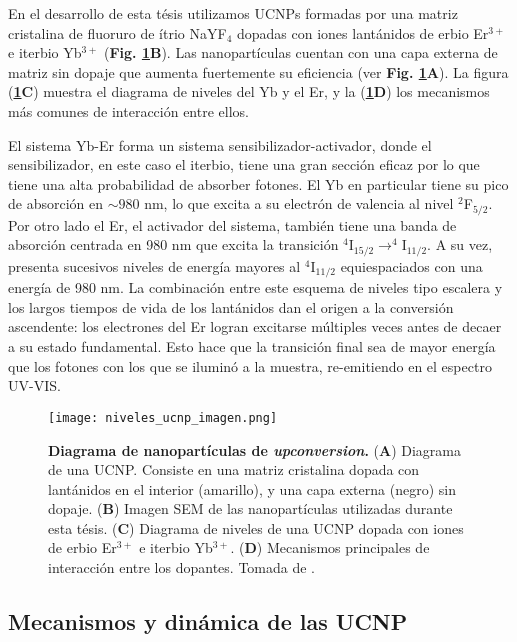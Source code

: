 En el desarrollo de esta tésis utilizamos UCNPs formadas por una matriz cristalina de fluoruro de ítrio NaYF$_4$ dopadas con iones lantánidos de erbio Er$^{3+}$ e iterbio Yb$^{3+}$ (\textbf{Fig. \ref{fig:ucnp_niveles}B}).
Las nanopartículas cuentan con una capa externa de matriz sin dopaje que aumenta fuertemente su eficiencia (ver \textbf{Fig. \ref{fig:ucnp_niveles}A})\cite{mai_highly_2007,caracterizacion_ucnps_unicas}.
La figura (\textbf{\ref{fig:ucnp_niveles}C}) muestra el diagrama de niveles del Yb y el Er, y la (\textbf{\ref{fig:ucnp_niveles}D}) los mecanismos más comunes de interacción entre ellos.

El sistema Yb-Er forma un sistema sensibilizador-activador, donde el sensibilizador, en este caso el iterbio, tiene una gran sección eficaz por lo que tiene una alta probabilidad de absorber fotones.
El Yb en particular tiene su pico de absorción en $\sim 980$ nm, lo que excita a su electrón de valencia al nivel $^2$F$_{5/2}$.
Por otro lado el Er, el activador del sistema, también tiene una banda de absorción centrada en 980 nm que excita la transición $^4$I$_{15/2} \rightarrow ^4$I$_{11/2}$.
A su vez, presenta sucesivos niveles de energía mayores al $^4$I$_{11/2}$ equiespaciados con una energía de 980 nm.
La combinación entre este esquema de niveles tipo escalera y los largos tiempos de vida de los lantánidos dan el origen a la conversión ascendente: los electrones del Er logran excitarse múltiples veces antes de decaer a su estado fundamental.
Esto hace que la transición final sea de mayor energía que los fotones con los que se iluminó a la muestra, re-emitiendo en el espectro UV-VIS.

\begin{figure}
    \centering
    \texttt{[image: niveles\_ucnp\_imagen.png]}
    \caption{\textbf{Diagrama de nanopartículas de \textit{upconversion}.} (\textbf{A}) Diagrama de una UCNP. Consiste en una matriz cristalina dopada con lantánidos en el interior (amarillo), y una capa externa (negro) sin dopaje. (\textbf{B}) Imagen SEM de las nanopartículas utilizadas durante esta tésis. (\textbf{C}) Diagrama de niveles de una UCNP dopada con iones de erbio Er$^{3+}$ e iterbio Yb$^{3+}$. (\textbf{D}) Mecanismos principales de interacción entre los dopantes. Tomada de \cite{bujjamer2020}.}
    \label{fig:ucnp_niveles}
\end{figure}

\subsection{Mecanismos y dinámica de las UCNP}

